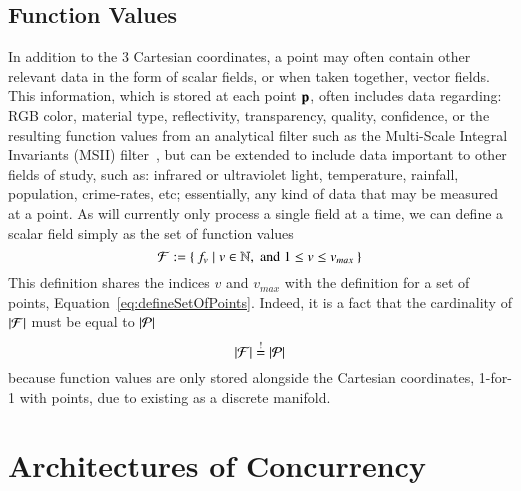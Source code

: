 %
%
%
\subsection{Function Values}
\label{ch2s3ssFV}
In addition to the 3 Cartesian coordinates, a point may often contain other relevant data in the form of scalar fields, or when taken together, vector fields. This information, which is stored at each point $\mathbf{p}$, often includes data regarding: RGB color, material type, reflectivity, transparency, quality, confidence, or the resulting function values from an analytical filter such as the Multi-Scale Integral Invariants (MSII) filter~\cite[p.~21]{Mara12}, but can be extended to include data important to other fields of study, such as: infrared or ultraviolet light, temperature, rainfall, population, crime-rates, etc; essentially, any kind of data that may be measured at a point. As  will currently only process a single field at a time, we can define a scalar field simply as the set of function values
%
\begin{equation}
	\mathcal{F} := \left \{\: f_v \mid v \in \mathbb{N}, \;\text{and}\; 1\leq v \leq v_{max} \:\right \}
	\label{eq:defineSetOfFunctionValues}
\end{equation}%
%
%
%
This definition shares the indices $v$ and $v_{max}$ with the definition for a set of points, Equation~\ref{eq:defineSetOfPoints}. Indeed, it is a fact that the cardinality of $|\mathcal{F}|$ must be equal to $|\mathcal{P}|$
%
\begin{equation}
	|\mathcal{F}| \overset{!}{=} |\mathcal{P}|
\end{equation}
%
because function values are only stored alongside the Cartesian coordinates, 1-for-1 with points, due to \tdd{} existing as a discrete manifold.

%
%
%
%
%
\section{Architectures of Concurrency}

%
%
%
